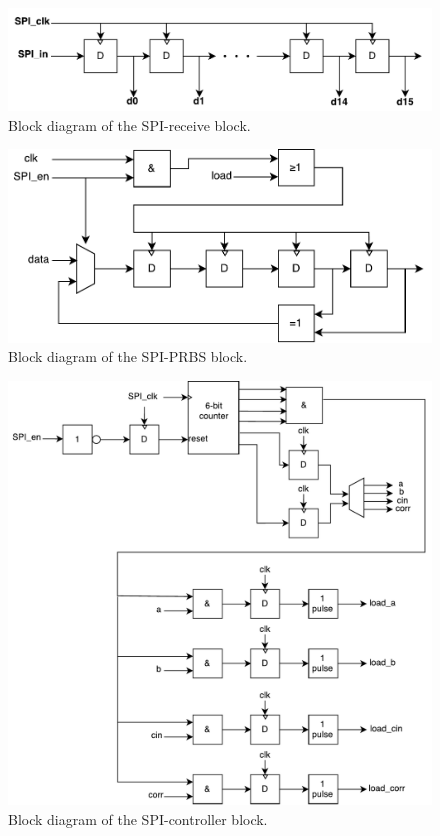 \begin{figure}[H]
	\centering
	\captionsetup{justification=centering}
	\includegraphics[scale=0.5]{../figures/SPI_receive.pdf}
	\caption{Block diagram of the SPI-receive block.} \label{fig:spi_receive}
\end{figure}

\begin{figure}[H]
	\centering
	\captionsetup{justification=centering}
	\includegraphics[scale=0.5]{../figures/SPI_PRBS.pdf}
	\caption{Block diagram of the SPI-PRBS block.} \label{fig:spi_prbs}
\end{figure}

\begin{figure}[H]
	\centering
	\captionsetup{justification=centering}
	\includegraphics[scale=0.5]{../figures/SPI_controller.pdf}
	\caption{Block diagram of the SPI-controller block.} \label{fig:spi_controller}
\end{figure}

